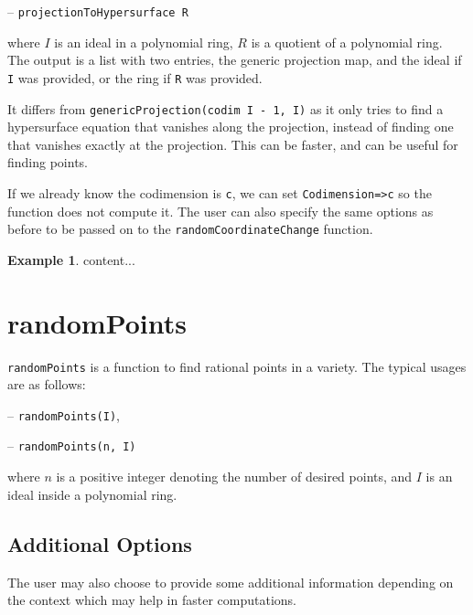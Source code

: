 \documentclass[11pt]{amsart}
\theoremstyle{definition}
\newtheorem{example}{Example}[section]
\begin{document}
\begin{enumerate}
-- {\tt projectionToHypersurface R} 

\vspace{1em}
\noindent where $I$ is an ideal in a polynomial ring, $R$ is a quotient of a polynomial ring. The output is
a list with two entries, the generic projection map, and the ideal if {\tt I} was provided, or the ring if {\tt R} was provided.

It differs from {\tt genericProjection(codim I - 1, I)} as it only tries to find a hypersurface equation that vanishes along the projection, instead of finding one that vanishes exactly at the projection.  This can be faster, and can be useful for finding points. 

If we already know the codimension is {\tt c}, we can set {\tt Codimension=>c} so the function does not compute it. The user can also specify the same options as before to be passed on to the {\tt randomCoordinateChange} function.

\begin{example}
	content...
\end{example}
\end{enumerate}
\section{randomPoints}\label{randomPoints}
{\tt randomPoints} is a function to find rational points in a variety. The typical usages are as follows: 

\vspace{1em}
-- {\tt randomPoints(I)}, 

-- {\tt randomPoints(n, I)} 

\vspace{1em}
\noindent where $n$ is a positive integer denoting the number of desired points, and 
$I$ is an ideal inside a polynomial ring.


\subsection{Additional Options}\label{strategydetails}

The user may also choose to provide some additional information depending on the context which may help in faster computations. 
\end{document}
